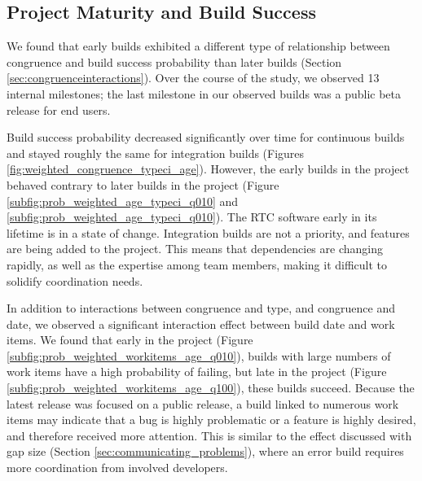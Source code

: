 

\subsection{Project Maturity and Build Success}

We found that early builds exhibited a different type of relationship between congruence and build success probability than later builds (Section \ref{sec:congruenceinteractions}). Over the course of the study, we observed 13 internal milestones; the last milestone in our observed builds was a public beta release for end users.

Build success probability decreased significantly over time for continuous builds and stayed roughly the same for integration builds (Figures \ref{fig:weighted_congruence_typeci_age}).
However, the early builds in the project behaved contrary to later builds in the project (Figure \ref{subfig:prob_weighted_age_typeci_q010} and \ref{subfig:prob_weighted_age_typeci_q010}). The RTC software early in its lifetime is in a state of change. Integration builds are not a priority, and features are being added to the project. This means that dependencies are changing rapidly, as well as the expertise among team members, making it difficult to solidify coordination needs.

In addition to interactions between congruence and type, and congruence and date, we observed a significant interaction effect between build date and work items.
We found that early in the project (Figure \ref{subfig:prob_weighted_workitems_age_q010}), builds with large numbers of work items have a high probability of failing, but late in the project (Figure \ref{subfig:prob_weighted_workitems_age_q100}), these builds succeed. Because the latest release was focused on a public release, a build linked to numerous work items may indicate that a bug is highly problematic or a feature is highly desired, and therefore received more attention. This is similar to the effect discussed with gap size (Section \ref{sec:communicating_problems}), where an error build requires more coordination from involved developers.




